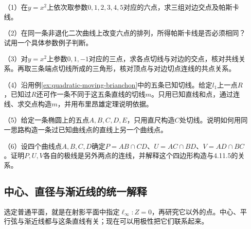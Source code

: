 \begin{exercise}
\mbox{}\par\nobreak
\begin{samepage}
（1）在\(y=x^2\)上依次取参数\(0,1,2,3,4,5\)对应的六点，求三组对边交点及帕斯卡线。
\par
\end{samepage}

\begin{samepage}
（2）在同一条非退化二次曲线上改变六点的排列，所得帕斯卡线是否必须相同？试用一个具体参数例子判断。
\par
\end{samepage}

\begin{samepage}
（3）对\(y=x^2\)上参数\(0,1,-1\)对应的三点，求各点切线与对边的交点，核对共线关系。再取三条端点切线所成的三角形，核对顶点与对边切点连线的共点关系。
\par
\end{samepage}

\begin{samepage}
（4）沿用例\ref{ex:quadratic-moving-brianchon}中的五条已知切线。给定\(l_1\)上一点\(R\)，已知过\(R\)还可作一条不同于这五条直线的切线\(m\)。只用已知直线和点，通过连线、求交点构造\(m\)，并用布里昂雄定理说明依据。
\par
\end{samepage}

\begin{samepage}
（5）给定一条椭圆上的五点\(A,B,C,D,E\)，只用直尺构造\(C\)处切线。说明如何用同一思路构造一条过已知曲线点的直线上另一个曲线点。
\par
\end{samepage}

\begin{samepage}
（6）设四个曲线点\(A,B,C,D\)确定\(P=AB\cap CD\)、\(U=AC\cap BD\)、\(V=AD\cap BC\)。证明\(P,U,V\)各自的极线是另外两点的连线，并解释这个四边形构造与4.11.5的关系。
\par
\end{samepage}
\end{exercise}

\newpage
\subsection{中心、直径与渐近线的统一解释}
\label{subsec:quadratic-centers-and-infinity}

选定普通平面，就是在射影平面中指定\(\ell_\infty:Z=0\)，再研究它以外的点。中心、平行弦与渐近线都与这条直线有关；现在可以用极性把它们联系起来。

